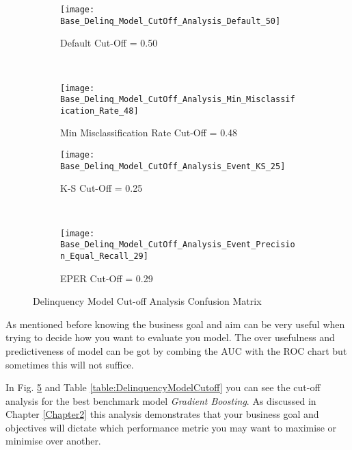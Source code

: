 \begin{figure}[H]
	\centering
	\begin{subfigure}[b]{0.45\textwidth}
		\captionsetup{font=scriptsize}
		\texttt{[image: Base\_Delinq\_Model\_CutOff\_Analysis\_Default\_50]}\caption{Default Cut-Off = 0.50}\label{fig:Base_Delinq_Model_CutOff_Analysis_Default_50}
	\end{subfigure}  ~\quad
	\begin{subfigure}[b]{0.45\textwidth}
		\captionsetup{font=scriptsize}
		\texttt{[image: Base\_Delinq\_Model\_CutOff\_Analysis\_Min\_Misclassification\_Rate\_48]}
		\caption{Min Misclassification Rate Cut-Off = 0.48}\label{fig:Base_Delinq_Model_CutOff_Analysis_Min_Misclassification_Rate_54}
	\end{subfigure} 
	\medskip \newline
	\begin{subfigure}[b]{0.45\textwidth}
		\captionsetup{font=scriptsize}
		\texttt{[image: Base\_Delinq\_Model\_CutOff\_Analysis\_Event\_KS\_25]}
		\caption{K-S Cut-Off = 0.25}\label{fig:Base_Delinq_Model_CutOff_Analysis_Event_KS_25}
	\end{subfigure} ~\quad
	\begin{subfigure}[b]{0.45\textwidth}
		\captionsetup{font=scriptsize}
		\texttt{[image: Base\_Delinq\_Model\_CutOff\_Analysis\_Event\_Precision\_Equal\_Recall\_29]}
		\caption{EPER Cut-Off = 0.29}\label{fig:Base_Delinq_Model_CutOff_Analysis_Event_Precision_Equal_Recall_29}
	\end{subfigure}
	\caption{Delinquency Model Cut-off Analysis Confusion Matrix}
	\label{fig:Base_Delinq_Model_CutOff_Analysis}
\end{figure}

As mentioned before knowing the business goal and aim can be very useful when trying to decide how you want to evaluate you model. The over usefulness and predictiveness of model can be got by combing the AUC with the ROC chart but sometimes this will not suffice. 

In Fig. \ref{fig:Base_Delinq_Model_CutOff_Analysis} and Table \ref{table:DelinquencyModelCutoff} you can see the cut-off analysis for the best benchmark model \textit{Gradient Boosting}. As discussed in Chapter \ref{Chapter2} this analysis demonstrates that your business goal and objectives will dictate which performance metric you may want to maximise or minimise over another. 

